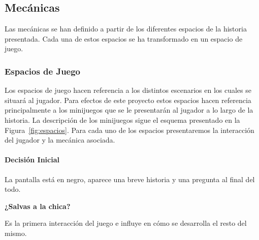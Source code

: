 \subsection{Mecánicas}
Las mecánicas se han definido a partir de los diferentes espacios de la historia presentada. Cada una de estos espacios se ha transformado en un espacio de juego.

\subsubsection{Espacios de Juego}
Los espacios de juego hacen referencia a los distintos escenarios en los cuales se situará al jugador. Para efectos de este proyecto estos espacios hacen referencia principalmente a los minijuegos que se le presentarán al jugador a lo largo de la historia. La descripción de los minijuegos sigue el esquema presentado en la Figura~\ref{fig:espacios}.  Para cada uno de los espacios presentaremos la interacción del jugador y la mecánica asociada.

\paragraph{Decisión Inicial}
La pantalla está en negro, aparece una breve historia y una pregunta al final del todo.
\begin{center} \textbf{¿Salvas a la chica?} \end{center}

Es la primera interacción del juego e influye en cómo se desarrolla el resto del mismo.

